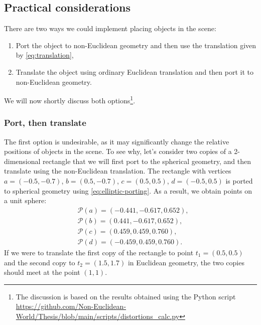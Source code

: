 \subsection{Practical considerations} \label{subsec:practical_considerations}%
There are two ways we could implement placing objects in the scene:
\begin{enumerate}
    \item Port the object to non-Euclidean geometry and then use the translation given by \autoref{eq:translation},
    \item Translate the object using ordinary Euclidean translation and then port it to non-Euclidean geometry.
\end{enumerate}
We will now shortly discuss both options\footnote{The discussion is based on the results obtained using the Python script \url{https://github.com/Non-Euclidean-World/Thesis/blob/main/scripts/distortions_calc.py}}.

\subsubsection*{Port, then translate}
The first option is undesirable, as it may significantly change the relative positions of objects in the scene.
To see why, let's consider two copies of a 2-dimensional rectangle that we will first port to the spherical geometry, and then translate using the non-Euclidean translation.
The rectangle with vertices $a = (-0.5, -0.7)$, $b = (0.5, -0.7)$, $c = (0.5, 0.5)$, $d = (-0.5, 0.5)$ is ported to spherical geometry using \autoref{eq:elliptic-porting}.
As a result, we obtain points on a unit sphere:
\begin{equation*}
    \begin{split}
         & \mathcal{P}(a) = (-0.441, -0.617, 0.652), \\
         & \mathcal{P}(b) = (0.441, -0.617, 0.652),  \\
         & \mathcal{P}(c) = (0.459, 0.459, 0.760),   \\
         & \mathcal{P}(d) = (-0.459, 0.459, 0.760).
    \end{split}
\end{equation*}
If we were to translate the first copy of the rectangle to point $t_1 = (0.5, 0.5)$ and the second copy to $t _2 = (1.5, 1.7)$ in Euclidean geometry, the two copies should meet at the point $(1, 1)$.


